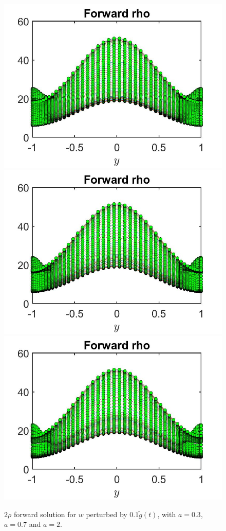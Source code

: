 \documentclass[11pt, a4paper]{article}
\theoremstyle{definition}
\begin{document}
	\begin{figure}[h]
		\includegraphics[scale=0.25]{rho203.jpg}
		\includegraphics[scale=0.25]{rho207.jpg}
		\includegraphics[scale=0.25]{rho22.jpg}
		\caption{$2\rho$ forward solution for $w$ perturbed by $0.1 \tilde g(t)$, with $a = 0.3$, $a=0.7$ and $a = 2$. }
		\label{gTest1}
	\end{figure}
	
\end{document}
